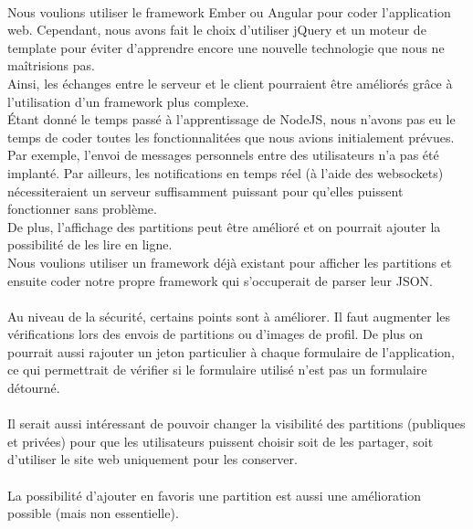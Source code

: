 \paragraph{}

\paragraph{}
Nous voulions utiliser le framework Ember ou Angular pour coder l'application web. Cependant, nous avons fait le choix d'utiliser jQuery et un moteur de template pour éviter d'apprendre encore une nouvelle technologie que nous ne maîtrisions pas. \\
Ainsi, les échanges entre le serveur et le client pourraient être améliorés grâce à l'utilisation d'un framework plus complexe. \\
Étant donné le temps passé à l'apprentissage de NodeJS, nous n'avons pas eu le temps de coder toutes les fonctionnalitées que nous avions initialement prévues. \\
Par exemple, l'envoi de messages personnels entre des utilisateurs n'a pas été implanté. Par ailleurs, les notifications en temps réel (à l'aide des websockets) nécessiteraient un serveur suffisamment puissant pour qu'elles puissent fonctionner sans problème. \\
De plus, l'affichage des partitions peut être amélioré et on pourrait ajouter la possibilité de les lire en ligne. \\
Nous voulions utiliser un framework déjà existant pour afficher les partitions et ensuite coder notre propre framework qui s'occuperait de parser leur JSON. \\
\paragraph{}
Au niveau de la sécurité, certains points sont à améliorer. Il faut augmenter les vérifications lors des envois de partitions ou d'images de profil. De plus on pourrait aussi rajouter un jeton particulier à chaque formulaire de l'application, ce qui permettrait de vérifier si le formulaire utilisé n'est pas un formulaire détourné.

\paragraph{}
Il serait aussi intéressant de pouvoir changer la visibilité des partitions (publiques et privées) pour que les utilisateurs puissent choisir soit de les partager, soit d'utiliser le site web uniquement pour les conserver.

\paragraph{}
La possibilité d'ajouter en favoris une partition est aussi une amélioration possible (mais non essentielle).

